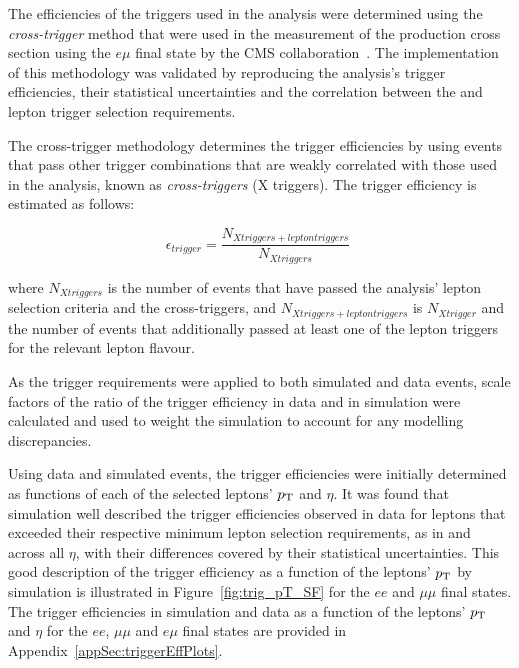 The efficiencies of the triggers used in the analysis were determined using the \emph{cross-trigger} method that were used in the measurement of the \ttbar production cross section using the $e\mu$ final state by the CMS collaboration~\cite{Khachatryan:2016kzg}.
The implementation of this methodology was validated by reproducing the \ttbar analysis's trigger efficiencies, their statistical uncertainties and the correlation between the \MET and lepton trigger selection requirements. 

The cross-trigger methodology determines the trigger efficiencies by using events that pass other trigger combinations that are weakly correlated with those used in the analysis, known as \emph{cross-triggers} (X triggers).
The trigger efficiency is estimated as follows:

\begin{equation}
\epsilon_{trigger} = \frac{N_{X triggers + lepton triggers}}{N_{X triggers}} \;
\end{equation}

where $N_{X triggers}$ is the number of events that have passed the analysis' lepton selection criteria and the cross-triggers, and $N_{X triggers + lepton triggers}$ is $N_{X trigger}$ and the number of events that additionally passed at least one of the lepton triggers for the relevant lepton flavour.

As the trigger requirements were applied to both simulated and data events, scale factors of the ratio of the trigger efficiency in data and in simulation were calculated and used to weight the simulation to account for any modelling discrepancies.

Using data and simulated \ttbar events, the trigger efficiencies were initially determined as functions of each of the selected leptons' $p_{\mathrm{T}}$ and $\eta$.
It was found that simulation well described the trigger efficiencies observed in data for leptons that exceeded their respective minimum lepton \pT selection requirements, as  in  and across all $\eta$, with their differences covered by their statistical uncertainties.
This good description of the trigger efficiency as a function of the leptons' $p_{\mathrm{T}}$ by simulation is illustrated in Figure~\ref{fig:trig_pT_SF} for the $ee$ and $\mu\mu$ final states.
The trigger efficiencies in simulation and data as a function of the leptons' $p_{\mathrm{T}}$ and $\eta$ for the $ee$, $\mu\mu$ and $e\mu$ final states are provided in Appendix~\ref{appSec:triggerEffPlots}.

